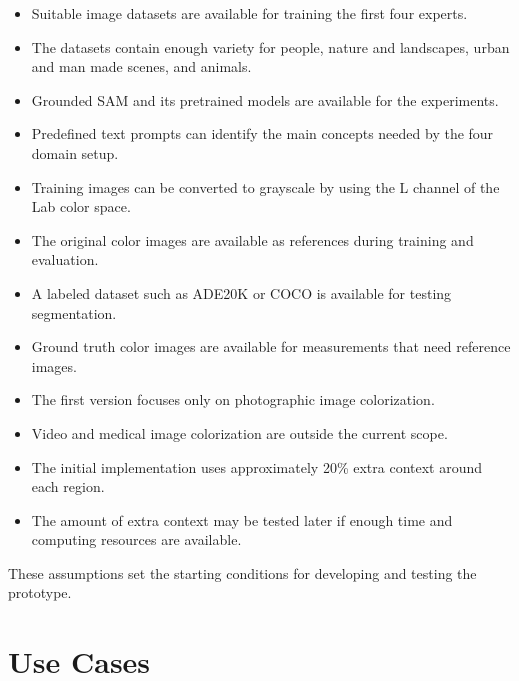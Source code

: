 \documentclass{FastFyp}
\begin{document}
\begin{itemize}
    \item Suitable image datasets are available for training the first four experts.
    
    \item The datasets contain enough variety for people, nature and landscapes, urban and man made scenes, and animals.
    
    \item Grounded SAM and its pretrained models are available for the experiments.
    
    \item Predefined text prompts can identify the main concepts needed by the four domain setup.
    
    \item Training images can be converted to grayscale by using the L channel of the Lab color space.
    
    \item The original color images are available as references during training and evaluation.
    
    \item A labeled dataset such as ADE20K or COCO is available for testing segmentation.
    
    \item Ground truth color images are available for measurements that need reference images.
    
    \item The first version focuses only on photographic image colorization.
    
    \item Video and medical image colorization are outside the current scope.
    
    \item The initial implementation uses approximately 20\% extra context around each region.
    
    \item The amount of extra context may be tested later if enough time and computing resources are available.
\end{itemize}

These assumptions set the starting conditions for developing and testing the prototype.

\section{Use Cases}
\end{document}
